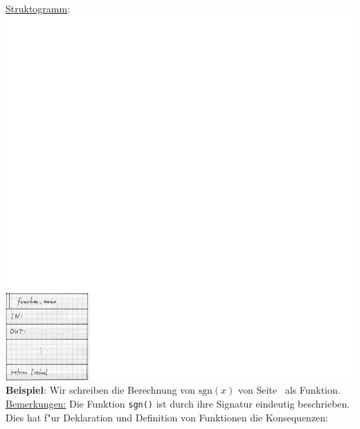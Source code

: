 \underline{Struktogramm}: %
\includegraphics[scale=0.55]{GIF/p69}
%
\\
\textbf{Beispiel}: Wir schreiben die Berechnung von
$\text{sgn}(x)$ von Seite~\pageref{bsp:sgn1} als Funktion.
%
%
\underline {Bemerkungen:}
 Die Funktion \verb|sgn()| ist durch ihre Signatur eindeutig beschrieben.
 Dies hat f"ur Deklaration und Definition von Funktionen die Konsequenzen:
